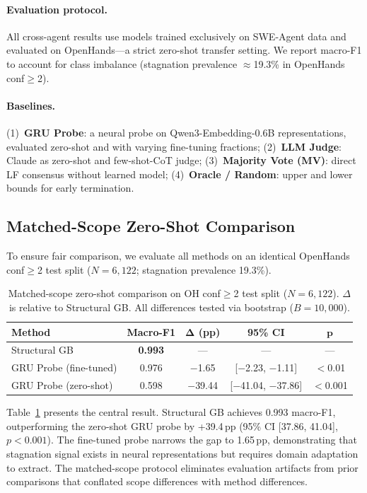 \documentclass[11pt,a4paper]{article}
\begin{document}
\paragraph{Evaluation protocol.}
All cross-agent results use models trained exclusively on SWE-Agent data and evaluated on OpenHands---a strict zero-shot transfer setting.
We report macro-F1 to account for class imbalance (stagnation prevalence $\approx$19.3\% in OpenHands conf$\geq$2).

\paragraph{Baselines.}
(1)~\textbf{GRU Probe}: a neural probe on Qwen3-Embedding-0.6B representations, evaluated zero-shot and with varying fine-tuning fractions;
(2)~\textbf{LLM Judge}: Claude as zero-shot and few-shot-CoT judge;
(3)~\textbf{Majority Vote (MV)}: direct LF consensus without learned model;
(4)~\textbf{Oracle / Random}: upper and lower bounds for early termination.

\subsection{Matched-Scope Zero-Shot Comparison}
\label{sec:matched-scope}

To ensure fair comparison, we evaluate all methods on an identical OpenHands conf$\geq$2 test split ($N{=}6{,}122$; stagnation prevalence 19.3\%).

\begin{table}[t]
\centering
\caption{Matched-scope zero-shot comparison on OH conf$\geq$2 test split ($N{=}6{,}122$). $\Delta$ is relative to Structural GB. All differences tested via bootstrap ($B{=}10{,}000$).}
\label{tab:matched-scope}
\begin{tabular}{lcccc}
\toprule
\textbf{Method} & \textbf{Macro-F1} & $\boldsymbol{\Delta}$ \textbf{(pp)} & \textbf{95\% CI} & $\boldsymbol{p}$ \\
\midrule
Structural GB & \textbf{0.993} & --- & --- & --- \\
GRU Probe (fine-tuned) & 0.976 & $-$1.65 & [$-$2.23, $-$1.11] & $<$0.01 \\
GRU Probe (zero-shot) & 0.598 & $-$39.44 & [$-$41.04, $-$37.86] & $<$0.001 \\
\bottomrule
\end{tabular}
\end{table}

Table~\ref{tab:matched-scope} presents the central result.
Structural GB achieves 0.993 macro-F1, outperforming the zero-shot GRU probe by +39.4\,pp (95\% CI [37.86, 41.04], $p<0.001$).
The fine-tuned probe narrows the gap to 1.65\,pp, demonstrating that stagnation signal exists in neural representations but requires domain adaptation to extract.
The matched-scope protocol eliminates evaluation artifacts from prior comparisons that conflated scope differences with method differences.
\end{document}
